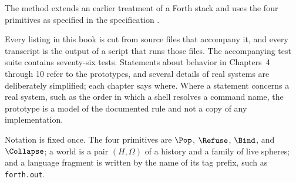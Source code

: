 The method extends an earlier treatment of a Forth stack \cite{flyxion-forth} and uses the four primitives as specified in the \SP{} specification \cite{flyxion-spec}.

Every listing in this book is cut from source files that accompany it, and every transcript is the output of a script that runs those files. The accompanying test suite contains seventy-six tests. Statements about behavior in Chapters~4 through 10 refer to the prototypes, and several details of real systems are deliberately simplified; each chapter says where. Where a statement concerns a real system, such as the order in which a shell resolves a command name, the prototype is a model of the documented rule and not a copy of any implementation.

Notation is fixed once. The four primitives are $\Pop$, $\Refuse$, $\Bind$, and $\Collapse$; a world is a pair $(H,\Omega)$ of a history and a family of live spheres; and a language fragment is written by the name of its tag prefix, such as \texttt{forth.out}.
